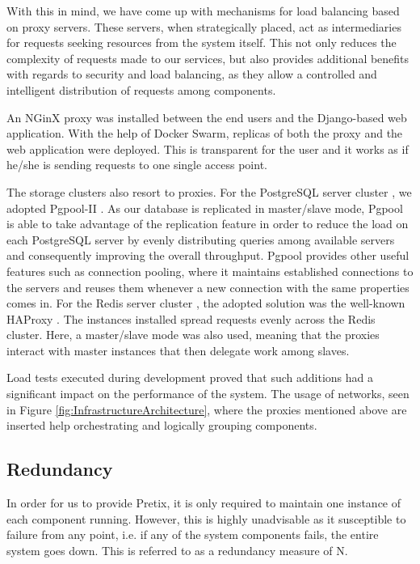 \documentclass[12pt]{article}
\begin{document}
With this in mind, we have come up with mechanisms for load balancing based on proxy servers.
These servers, when strategically placed, act as intermediaries for requests seeking resources from the system itself.
This not only reduces the complexity of requests made to our services, but also provides additional benefits with regards to security and load balancing,
as they allow a controlled and intelligent distribution of requests among components.

An NGinX proxy \cite{nginx} was installed between the end users and the Django-based web application.
With the help of Docker Swarm, replicas of both the proxy and the web application were deployed.
This is transparent for the user and it works as if he/she is sending requests to one single access point.

The storage clusters also resort to proxies.
For the PostgreSQL server cluster \cite{postgresql}, we adopted Pgpool-II \cite{pgpool}.
As our database is replicated in master/slave mode, Pgpool is able to take advantage of the replication feature in order to reduce the load on each PostgreSQL server
by evenly distributing queries among available servers and consequently improving the overall throughput.
Pgpool provides other useful features such as connection pooling, where it maintains established connections to the servers and reuses them whenever a new
connection with the same properties comes in.
For the Redis server cluster \cite{redis}, the adopted solution was the well-known HAProxy \cite{haproxy}.
The instances installed spread requests evenly across the Redis cluster. 
Here, a master/slave mode was also used, meaning that the proxies interact with master instances that then delegate work among slaves.

Load tests executed during development proved that such additions had a significant impact on the performance of the system.
The usage of networks, seen in Figure \ref{fig:InfrastructureArchitecture}, where the proxies mentioned above are inserted help orchestrating and logically
grouping components.

\subsection{Redundancy} \label{architecture.redundancy} %


In order for us to provide Pretix, it is only required to maintain one instance of each component running.
However, this is highly unadvisable as it susceptible to failure from any point, i.e. if any of the system components fails, the entire system goes down.
This is referred to as a redundancy measure of N.
\end{document}
